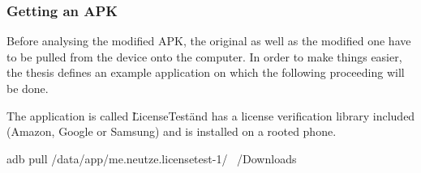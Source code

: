 \subsubsection{Getting an APK}\label{subsubsection:tools-apk}
Before analysing the modified \gls{APK}, the original as well as the modified one have to be pulled from the device onto the computer. In order to make things easier, the thesis defines an example application on which the following proceeding will be done.


The application is called \"LicenseTest\" and has a license verification library included (Amazon, Google or Samsung) and is installed on a rooted phone.


adb pull /data/app/me.neutze.licensetest-1/ ~/Downloads
